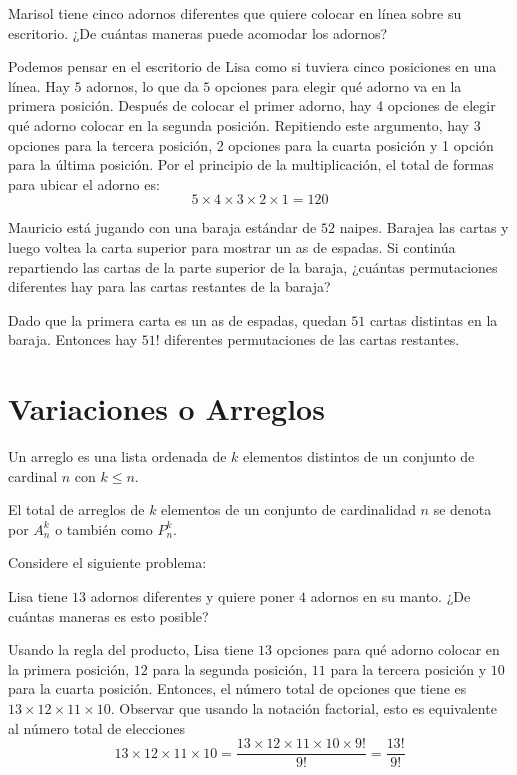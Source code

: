 \begin{ejemplo}
Marisol tiene cinco adornos diferentes que quiere colocar en línea sobre su escritorio. ¿De cuántas maneras puede acomodar los adornos?
\end{ejemplo}
Podemos pensar en el escritorio de Lisa como si tuviera cinco posiciones en una línea. Hay $5$ adornos, lo que da $5$ opciones para elegir qué adorno va en la primera posición. Después de colocar el primer adorno, hay 4 opciones de elegir qué adorno colocar en la segunda posición. Repitiendo este argumento, hay 3 opciones para la tercera posición, 2 opciones para la cuarta posición y 1 opción para la última posición. Por el principio de la multiplicación, el total de formas para ubicar el adorno es:
\[5\times 4\times 3\times 2\times 1=120\]


\begin{ejemplo}
Mauricio está jugando con una baraja estándar de $52$ naipes. Barajea las cartas y luego voltea la carta superior para mostrar un as de espadas. Si continúa repartiendo las cartas de la parte superior de la baraja, ¿cuántas permutaciones diferentes hay para las cartas restantes de la baraja?
\end{ejemplo}
\begin{solucion}
    Dado que la primera carta es un as de espadas, quedan $51$ cartas distintas en la baraja. Entonces hay $51!$ diferentes permutaciones de las cartas restantes.
\end{solucion}
\section{Variaciones o Arreglos}

\begin{definicion}
Un arreglo es una lista ordenada de $k$ elementos distintos de un conjunto de cardinal $n$ con $k\leq n$.
\end{definicion}

El total de arreglos de $k$ elementos de un conjunto de cardinalidad $n$ se denota por $A_n^k$ o también como $P_n^k$.

Considere el siguiente problema:

\begin{center}
    Lisa tiene $13$ adornos diferentes y quiere poner $4$ adornos en su manto. ¿De cuántas maneras es esto posible?
\end{center}
Usando la regla del producto, Lisa tiene $13$ opciones para qué adorno colocar en la primera posición, $12$ para la segunda posición, $11$ para la tercera posición y $10$ para la cuarta posición. Entonces, el número total de opciones que tiene es $13 \times 12 \times 11 \times 10$. Observar que usando la notación factorial, esto es equivalente al número total de elecciones
\[13\times 12\times 11\times 10=\frac{13\times 12\times 11\times 10\times 9!}{9!}=\frac{13!}{9!}\]

